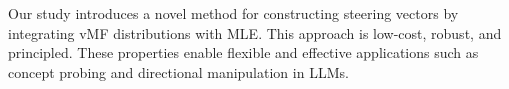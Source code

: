 

Our study introduces a novel method for constructing steering vectors by integrating vMF distributions with MLE. This approach is low-cost, robust, and principled. These properties enable flexible and effective applications such as concept probing and directional manipulation in LLMs.